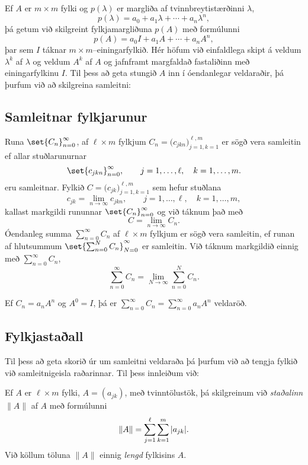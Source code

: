 \noindent
Ef $A$ er $m\times m$ fylki og $p(\lambda)$ er margliða af
tvinnbreytistærðinni $\lambda$, 
 $$p(\lambda)=a_0+a_1\lambda+\cdots+a_n\lambda^n, 
 $$
þá getum við skilgreint  fylkjamargliðuna $p(A)$ með formúlunni
 $$p(A)=a_0 I+a_1A+\cdots+a_n A^n, 
 $$
þar sem $I$ táknar $m\times m$--einingarfylkið.  Hér höfum við
einfaldlega skipt á veldum $\lambda^k$ af $\lambda$ og veldum $A^k$
af $A$ og jafnframt margfaldað fastaliðinn með einingarfylkinu $I$. 
Til þess að geta stungið $A$ inn í  óendanlegar veldaraðir, þá þurfum
við að skilgreina samleitni:

\subsection*{Samleitnar fylkjarunur}

\begin{sk}  Runa $\set{C_n}_{n=0}^\infty$,  af
$\ell\times m$ fylkjum $C_n=\big(c_{jkn}\big)_{j=1,k=1}^{\ell, m}$
er sögð vera samleitin ef allar stuðlarunurnar
 $$\set{c_{jkn}}_{n=0}^\infty, \qquad j=1,\dots,\ell, \quad k=1,\dots, m.
 $$
eru samleitnar.  Fylkið $C=\big(c_{jk}\big)_{j=1,k=1}^{\ell, m}$ sem
hefur stuðlana
 $$c_{jk}=\lim\limits_{n\to\infty}c_{jkn}, \qquad j=1,\dots,\ell, \quad
k=1,\dots, m,
 $$
kallast markgildi rununnar $\set{C_n}_{n=0}^\infty$ og við táknum það
með
 $$C=\lim\limits_{n\to \infty}C_n.
 $$
Óendanleg summa $\sum_{n=0}^\infty C_n$ af $\ell\times m$ fylkjum er
sögð vera samleitin, ef runan af hlutsummum  $\set{\sum_{n=0}^N
C_n}_{N=0}^\infty$  er samleitin.  Við táknum markgildið einnig með
$\sum_{n=0}^\infty C_n$,
 $$\sum_{n=0}^\infty C_n= \lim\limits_{N\to \infty}
\sum_{n=0}^N C_n.
 $$
\end{sk}

Ef $C_n=a_n A^n$ og $A^0=I$, þá er 
$\sum_{n=0}^\infty C_n=\sum_{n=0}^\infty a_nA^n$ 
veldaröð.  


\subsection*{Fylkjastaðall}

Til þess að geta
skorið úr um samleitni veldaraða þá þurfum við að tengja fylkið við
samleitnigeisla raðarinnar.  Til þess innleiðum við:

\begin{sk}  Ef $A$ er $\ell\times m$ fylki, $A=(a_{jk})$,
með tvinntölustök, þá skilgreinum við {\it staðalinn} $\|A\|$ af $A$ með
formúlunni 
 $$\|A\|=\sum_{j=1}\sp \ell \sum_{k=1}\sp m |a_{jk}|.
 $$
Við köllum töluna $\|A\|$ einnig {\it
lengd} fylkisins $A$.
\end{sk}

